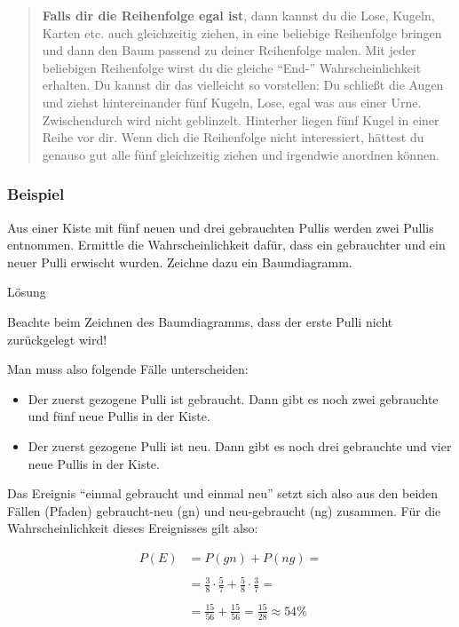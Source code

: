 \documentclass[
  ngerman,
]{book}
\begin{document}
\begin{quote}
\textbf{Falls dir die Reihenfolge egal ist}, dann kannst du die Lose, Kugeln, Karten etc. auch gleichzeitig ziehen, in eine beliebige Reihenfolge bringen und dann den Baum passend zu deiner Reihenfolge malen. Mit jeder beliebigen Reihenfolge wirst du die gleiche ``End-'' Wahrscheinlichkeit erhalten. Du kannst dir das vielleicht so vorstellen: Du schließt die Augen und ziehst hintereinander fünf Kugeln, Lose, egal was aus einer Urne. Zwischendurch wird nicht geblinzelt. Hinterher liegen fünf Kugel in einer Reihe vor dir. Wenn dich die Reihenfolge nicht interessiert, hättest du genauso gut alle fünf gleichzeitig ziehen und irgendwie anordnen können.
\end{quote}

\hypertarget{beispiel-4}{%
\subsubsection*{Beispiel}\label{beispiel-4}}

Aus einer Kiste mit fünf neuen und drei gebrauchten Pullis werden zwei Pullis entnommen. Ermittle die Wahrscheinlichkeit dafür, dass ein gebrauchter und ein neuer Pulli erwischt wurden. Zeichne dazu ein Baumdiagramm.

Lösung

Beachte beim Zeichnen des Baumdiagramms, dass der erste Pulli nicht zurückgelegt wird!

Man muss also folgende Fälle unterscheiden:

\begin{itemize}
\item
  Der zuerst gezogene Pulli ist gebraucht. Dann gibt es noch zwei gebrauchte und fünf neue Pullis in der Kiste.
\item
  Der zuerst gezogene Pulli ist neu. Dann gibt es noch drei gebrauchte und vier neue Pullis in der Kiste.
\end{itemize}

Das Ereignis ``einmal gebraucht und einmal neu'' setzt sich also aus den beiden Fällen (Pfaden) gebraucht-neu (gn) und neu-gebraucht (ng) zusammen. Für die Wahrscheinlichkeit dieses Ereignisses gilt also:

\[\begin{align} P(E)&=P(gn)+P(ng)= \\
{}\\
&= \frac{3}{8}\cdot\frac{5}{7} + \frac{5}{8}\cdot\frac{3}{7} = \\
{}\\
&= \frac{15}{56} + \frac{15}{56} = \frac{15}{28} \approx 54\%\end{align}\]
\end{document}
